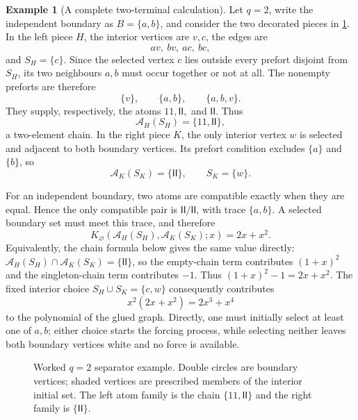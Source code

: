 \documentclass[11pt,reqno]{amsart}
\theoremstyle{definition}
\newtheorem{example}[example]{Example}
\begin{document}
\begin{example}[A complete two-terminal calculation]\label{ex:q2-separator}
Let $q=2$, write the independent boundary as $B=\{a,b\}$, and consider the
two decorated pieces in \cref{fig:q2-worked}.  In the left piece $H$, the
interior vertices are $v,c$, the edges are
\[
 av,\ bv,\ ac,\ bc,
\]
and $S_H=\{c\}$.  Since the selected vertex $c$ lies outside every prefort
disjoint from $S_H$, its two neighbours $a,b$ must occur together or not at
all.  The nonempty preforts are therefore
\[
 \{v\},\qquad \{a,b\},\qquad \{a,b,v\}.
\]
They supply, respectively, the atoms $11,\mathsf I\mathsf I,$ and
$\mathsf I\mathsf I$.  Thus
\[
 \mathcal A_H(S_H)=\{11,\mathsf I\mathsf I\},
\]
a two-element chain.  In the right piece $K$, the only interior vertex $w$ is
selected and adjacent to both boundary vertices.  Its prefort condition
excludes $\{a\}$ and $\{b\}$, so
\[
 \mathcal A_K(S_K)=\{\mathsf I\mathsf I\},\qquad S_K=\{w\}.
\]

For an independent boundary, two atoms are compatible exactly when they are
equal.  Hence the only compatible pair is
$\mathsf I\mathsf I/\mathsf I\mathsf I$, with trace $\{a,b\}$.  A selected
boundary set must meet this trace, and therefore
\[
 K_{\varnothing}(\mathcal A_H(S_H),\mathcal A_K(S_K);x)
 =2x+x^2.
\]
Equivalently, the chain formula below gives the same value directly:
$\mathcal A_H(S_H)\cap\mathcal A_K(S_K)=\{\mathsf I\mathsf I\}$, so the
empty-chain term contributes $(1+x)^2$ and the singleton-chain term contributes
$-1$.  Thus $(1+x)^2-1=2x+x^2$.  The fixed interior choice
$S_H\cup S_K=\{c,w\}$ consequently contributes
\[
 x^2(2x+x^2)=2x^3+x^4
\]
to the polynomial of the glued graph.  Directly, one must initially select at
least one of $a,b$; either choice starts the forcing process, while selecting
neither leaves both boundary vertices white and no force is available.
\end{example}

\begin{figure}[ht]
\centering
{}
\caption{Worked $q=2$ separator example.  Double circles are boundary
vertices; shaded vertices are prescribed members of the interior initial set.
The left atom family is the chain $\{11,\mathsf I\mathsf I\}$ and the right
family is $\{\mathsf I\mathsf I\}$.}
\label{fig:q2-worked}
\end{figure}
\end{document}
